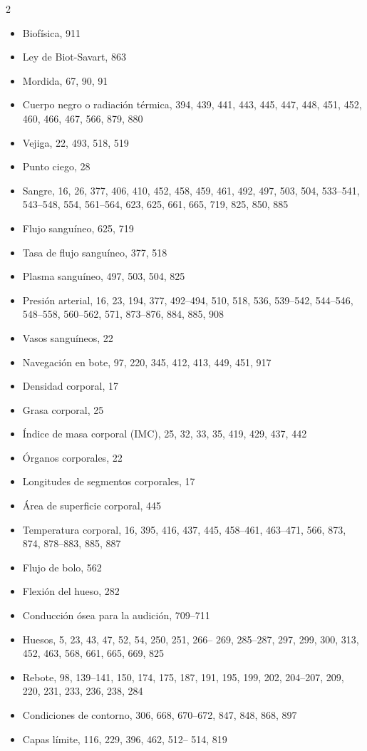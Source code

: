 \documentclass[12pt,a4paper]{book}
\begin{document}
\begin{multicols}{2}
\begin{itemize}[leftmargin=*]
  \item Biofísica, 911
  \item Ley de Biot-Savart, 863
  \item Mordida, 67, 90, 91
  \item Cuerpo negro o radiación térmica, 394, 439, 441, 443, 445, 447, 448, 451, 452, 460, 466, 467, 566, 879, 880
  \item Vejiga, 22, 493, 518, 519
  \item Punto ciego, 28
  \item Sangre, 16, 26, 377, 406, 410, 452, 458, 459, 461, 492, 497, 503, 504, 533--541, 543--548, 554, 561--564, 623, 625, 661, 665, 719, 825, 850, 885
  \item Flujo sanguíneo, 625, 719
  \item Tasa de flujo sanguíneo, 377, 518
  \item Plasma sanguíneo, 497, 503, 504, 825
  \item Presión arterial, 16, 23, 194, 377, 492--494, 510, 518, 536, 539--542, 544--546, 548--558, 560--562, 571, 873--876, 884, 885, 908
  \item Vasos sanguíneos, 22
  \item Navegación en bote, 97, 220, 345, 412, 413, 449, 451, 917
  \item Densidad corporal, 17
  \item Grasa corporal, 25
  \item Índice de masa corporal (IMC), 25, 32, 33, 35, 419, 429, 437, 442
  \item Órganos corporales, 22
  \item Longitudes de segmentos corporales, 17
  \item Área de superficie corporal, 445
  \item Temperatura corporal, 16, 395, 416, 437, 445, 458--461, 463--471, 566, 873, 874, 878--883, 885, 887
  \item Flujo de bolo, 562
  \item Flexión del hueso, 282
  \item Conducción ósea para la audición, 709--711
  \item Huesos, 5, 23, 43, 47, 52, 54, 250, 251, 266-- 269, 285--287, 297, 299, 300, 313, 452, 463, 568, 661, 665, 669, 825
  \item Rebote, 98, 139--141, 150, 174, 175, 187, 191, 195, 199, 202, 204--207, 209, 220, 231, 233, 236, 238, 284
  \item Condiciones de contorno, 306, 668, 670--672, 847, 848, 868, 897
  \item Capas límite, 116, 229, 396, 462, 512-- 514, 819

\end{itemize}
\end{multicols}
\end{document}
